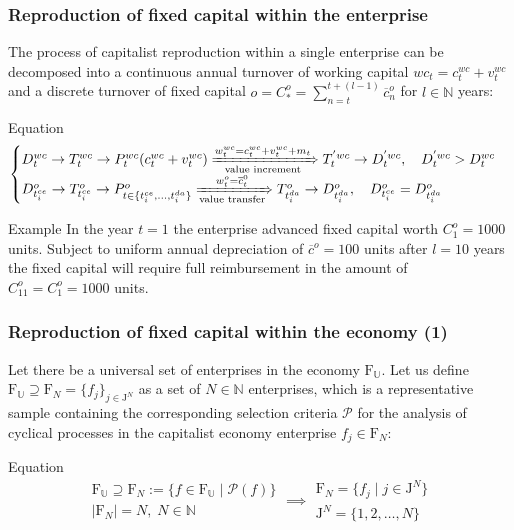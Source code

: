 \begin{frame}
  \frametitle{Reproduction of fixed capital within the enterprise}
  The process of capitalist reproduction within a single enterprise can be decomposed into a continuous annual turnover of working capital $wc_{t} = c^{wc}_{t} + v^{wc}_{t}$ and a discrete turnover of fixed capital $o=C^{o}_{*} = \sum_{n=t}^{t+(l-1)}\overline{c}^{o}_{n}$ for $l \in \mathbb{N}$ years:

  \begin{block}{Equation}
    \begin{equation}
      \begin{cases} D^{wc}_t \rightarrow T^{wc}_t \rightarrow P_t^{wc}(c^{wc}_t + v^{wc}_t) \xRightarrow[\text{value increment}]{w_t^{wc} = c^{wc}_t + v^{wc}_t + m_t} T_t^{'wc} \rightarrow D_t^{'wc}, \quad D^{'wc}_t > D^{wc}_t \\ D^o_{t^{ce}_i} \rightarrow T^o_{t^{ce}_i} \rightarrow P^o_{t \in \{t^{ce}_{i}, \dots, t^{da}_{i}\}} \xRightarrow[\text{value transfer}]{w^o_{t} = \overline{c}^{0}_{t}} T^o_{t^{da}_i} \rightarrow D^o_{t^{da}_i}, \quad D^{o}_{t^{ce}_{i}} = D^{o}_{t^{da}_{i}} \end{cases}
    \end{equation}
  \end{block}

  \begin{alertblock}{Example}
    In the year $t=1$ the enterprise advanced fixed capital worth $C^{o}_{1} = 1000$ units. Subject to uniform annual depreciation of $\overline{c}^{o} = 100$ units after $l = 10$ years the fixed capital will require full reimbursement in the amount of $C^{o}_{11} = C^{o}_{1} = 1000$ units.
  \end{alertblock}
\end{frame}

\begin{frame}
  \frametitle{Reproduction of fixed capital within the economy (1)}
  Let there be a universal set of enterprises in the economy $\mathrm{F}_{\mathbb{U}}$. Let us define $\mathrm{F}_{\mathbb{U}} \supseteq \mathrm F_N = \{f_j\}_{j \in \mathrm{J}^{N}}$ as a set of $N \in \mathbb N$ enterprises, which is a representative sample containing the corresponding selection criteria $\mathcal{P}$ for the analysis of cyclical processes in the capitalist economy enterprise $f_j \in \mathrm{F}_{N}$:

  \begin{block}{Equation}
    \begin{equation}
      \begin{aligned} \mathrm{F}_{\mathbb{U}} \supseteq \mathrm F_N := \{f \in \mathrm{F}_{\mathbb{U}} \mid \mathcal{P}(f)\} \\ |\mathrm{F}_{N}| = N, \; N \in \mathbb N \end{aligned} \implies \begin{aligned} \mathrm{F}_{N} = \{f_j \mid j \in \mathrm{J}^{N} \} \\ \mathrm{J}^{N} = \{ 1,2,\dots,N\} \end{aligned}
    \end{equation}
  \end{block}
\end{frame}

